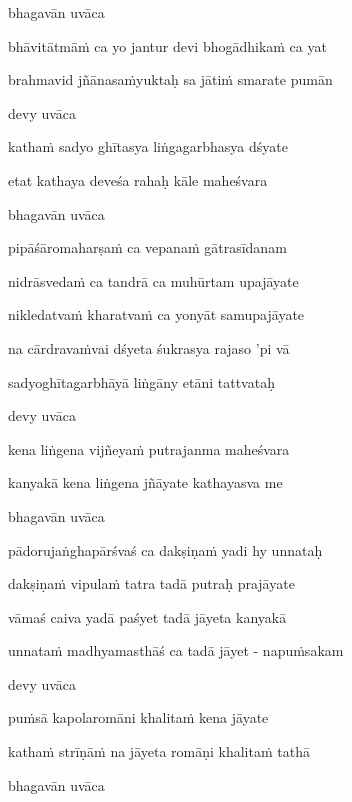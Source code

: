 bhagavān uvāca~{\dandab}\dontdisplaylinenum 

bhāvitātmāṁ ca yo jantur devi bhogādhikaṁ ca yat\thinspace{\danda} \dontdisplaylinenum

brahmavid jñānasaṁyuktaḥ sa jātiṁ smarate pumān \veg\dontdisplaylinenum

devy uvāca~{\dandab}\dontdisplaylinenum 

kathaṁ sadyo ghītasya liṅgagarbhasya dśyate\thinspace{\danda} \dontdisplaylinenum

etat kathaya deveśa rahaḥ kāle maheśvara \veg\dontdisplaylinenum

bhagavān uvāca~{\dandab}\dontdisplaylinenum 

pipāśāromaharṣaṁ ca vepanaṁ gātrasīdanam\thinspace{\danda} \dontdisplaylinenum

nidrāsvedaṁ ca tandrā ca muhūrtam upajāyate \veg\dontdisplaylinenum

nikledatvaṁ kharatvaṁ ca yonyāt samupajāyate\thinspace{\dandab} \dontdisplaylinenum

na cārdravaṁvai dśyeta śukrasya rajaso 'pi vā \danda\dontdisplaylinenum 

sadyoghītagarbhāyā liṅgāny etāni tattvataḥ \veg\dontdisplaylinenum

devy uvāca~{\dandab}\dontdisplaylinenum 

kena liṅgena vijñeyaṁ putrajanma maheśvara\thinspace{\danda} \dontdisplaylinenum

kanyakā kena liṅgena jñāyate kathayasva me \veg\dontdisplaylinenum

bhagavān uvāca~{\dandab}\dontdisplaylinenum 

pādorujaṅghapārśvaś ca dakṣiṇaṁ yadi hy unnataḥ\thinspace{\danda} \dontdisplaylinenum

dakṣiṇaṁ vipulaṁ tatra tadā putraḥ prajāyate \veg\dontdisplaylinenum

vāmaś caiva yadā paśyet tadā jāyeta kanyakā\thinspace{\dandab} \dontdisplaylinenum

unnataṁ madhyamasthāś ca tadā jāyet - napuṁsakam \veg\dontdisplaylinenum

devy uvāca~{\dandab}\dontdisplaylinenum 

puṁsā kapolaromāni khalitaṁ kena jāyate\thinspace{\danda} \dontdisplaylinenum

kathaṁ strīṇāṁ na jāyeta romāṇi khalitaṁ tathā \veg\dontdisplaylinenum

bhagavān uvāca~{\dandab}\dontdisplaylinenum 

